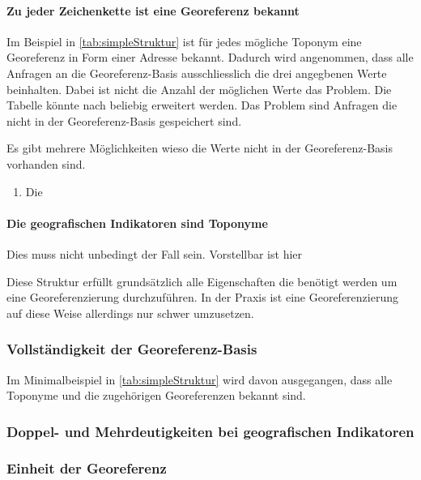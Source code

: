 			\paragraph{Zu jeder Zeichenkette ist eine Georeferenz bekannt}

				Im Beispiel in \ref{tab:simpleStruktur} ist für jedes mögliche Toponym eine Georeferenz in Form einer Adresse bekannt.
				Dadurch wird angenommen, dass alle Anfragen an die Georeferenz-Basis ausschliesslich die drei angegbenen Werte beinhalten. 
				Dabei ist nicht die Anzahl der möglichen Werte das Problem.
				Die Tabelle könnte nach beliebig erweitert werden.
				Das Problem sind Anfragen die nicht in der Georeferenz-Basis gespeichert sind.

				Es gibt mehrere Möglichkeiten wieso die Werte nicht in der Georeferenz-Basis vorhanden sind. 

				\begin{enumerate}
				 	\item Die  
				 \end{enumerate} 



			\paragraph{Die geografischen Indikatoren sind Toponyme}

				Dies muss nicht unbedingt der Fall sein. 
				Vorstellbar ist hier 

			Diese Struktur erfüllt grundsätzlich alle Eigenschaften die benötigt werden um eine Georeferenzierung durchzuführen. 
			In der Praxis ist eine Georeferenzierung auf diese Weise allerdings nur schwer umzusetzen.

			\subsubsection{Vollständigkeit der Georeferenz-Basis} 

				Im Minimalbeispiel in \ref{tab:simpleStruktur} wird davon ausgegangen, dass alle Toponyme und die zugehörigen Georeferenzen bekannt sind.		

			\subsubsection{Doppel- und Mehrdeutigkeiten bei geografischen Indikatoren} 



			\subsubsection{Einheit der Georeferenz} 


